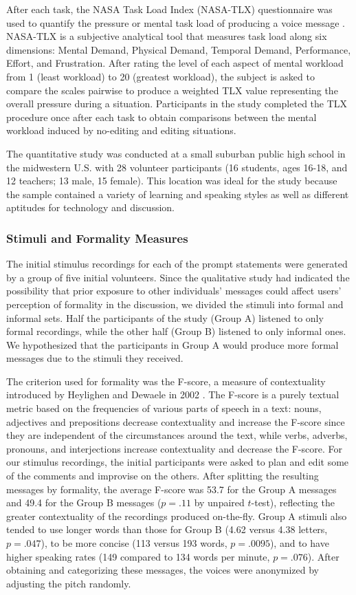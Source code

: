 After each task, the NASA Task Load Index (NASA-TLX) questionnaire was used to quantify the pressure or mental task load of producing a voice message \cite{nasatlx}. 
NASA-TLX is a subjective analytical tool that measures task load along six dimensions: Mental Demand, Physical Demand, Temporal Demand, Performance, Effort, and Frustration. 
After rating the level of each aspect of mental workload from 1 (least workload) to 20 (greatest workload), the subject is asked to compare the scales pairwise to produce a weighted TLX value representing the overall pressure during a situation. 
Participants in the study completed the TLX procedure once after each task to obtain comparisons between the mental workload induced by no-editing and editing situations.

The quantitative study was conducted at a small suburban public high school in the midwestern U.S. with 28 volunteer participants (16 students, ages 16-18, and 12 teachers; 13 male, 15 female).
This location was ideal for the study because the sample contained a variety of learning and speaking styles as well as different aptitudes for technology and discussion. 

\subsubsection{Stimuli and Formality Measures}\label{stimuli}

The initial stimulus recordings for each of the prompt statements were generated by a group of five initial volunteers. 
Since the qualitative study had indicated the possibility that prior exposure to other individuals' messages could affect users' perception of formality in the discussion, we divided the stimuli into formal and informal sets. 
Half the participants of the study (Group A) listened to only formal recordings, while the other half (Group B) listened to only informal ones.
We hypothesized that the participants in Group A would produce more formal messages due to the stimuli they received.

The criterion used for formality was the F-score, a measure of contextuality introduced by Heylighen and Dewaele in 2002 \cite{heylighen}.
The F-score is a purely textual metric based on the frequencies of various parts of speech in a text: nouns, adjectives and prepositions decrease contextuality and increase the F-score since they are independent of the circumstances around the text, while verbs, adverbs, pronouns, and interjections increase contextuality and decrease the F-score. 
For our stimulus recordings, the initial participants were asked to plan and edit some of the comments and improvise on the others.
After splitting the resulting messages by formality, the average F-score was 53.7 for the Group A messages and 49.4 for the Group B messages ($p=.11$ by unpaired $t$-test), reflecting the greater contextuality of the recordings produced on-the-fly.
Group A stimuli also tended to use longer words than those for Group B (4.62 versus 4.38 letters, $p=.047$), to be more concise (113 versus 193 words, $p=.0095$), and to have higher speaking rates (149 compared to 134 words per minute, $p=.076$).
After obtaining and categorizing these messages, the voices were anonymized by adjusting the pitch randomly.

